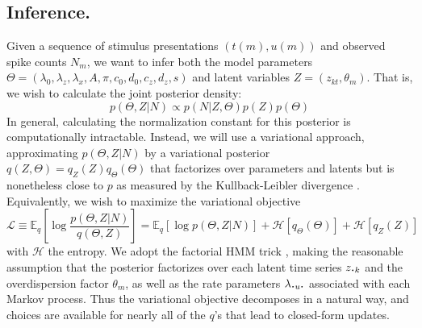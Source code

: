 \documentclass{nature}
\newcommand*{\bigcdot}{\raisebox{-0.25ex}{\scalebox{1.2}{$\cdot$}}}
\begin{document}
\subsection{Inference.}
Given a sequence of stimulus presentations $(t(m),u(m))$ and observed spike counts $N_m$, we want to infer both the model parameters $\Theta = (\lambda_0, \lambda_z, \lambda_x, A, \pi, c_0, d_0, c_z, d_z, s)$ and latent variables  $Z=(z_{kt},\theta_m)$. That is, we wish to calculate the joint posterior density:
\begin{equation}
    p(\Theta,Z|N) \propto p(N | Z, \Theta) p(Z) p(\Theta)
\end{equation}
In general, calculating the normalization constant for this posterior is computationally intractable. Instead, we will use a variational approach, approximating $p(\Theta, Z|N)$ by a variational posterior $q(Z, \Theta) = q_Z(Z) q_\Theta(\Theta)$ that factorizes over parameters and latents but is nonetheless close to $p$ as measured by the Kullback-Leibler divergence \cite{Wainwright2008-ii}. Equivalently, we wish to maximize the variational objective
\begin{equation}
    \label{elbo}
    \mathcal{L} \equiv \mathbb{E}_q \left[\log \frac{p(\Theta,Z|N)}{q(\Theta, Z)} \right] = \mathbb{E}_q \left[\log p(\Theta,Z|N) \right] + \mathcal{H}[q_\Theta(\Theta)] + \mathcal{H}[q_Z(Z)]
\end{equation}
with $\mathcal{H}$ the entropy. We adopt the factorial HMM trick \cite{ghahramani1997factorial}, making the reasonable assumption that the posterior factorizes over each latent time series $z_{\bigcdot k}$ and the overdispersion factor $\theta_m$, as well as the rate parameters $\lambda_{\bigcdot u \bigcdot}$ associated with each Markov process. Thus the variational objective decomposes in a natural way, and choices are available for nearly all of the $q$'s that lead to closed-form updates.
\end{document}
